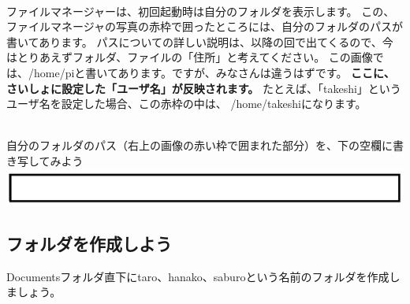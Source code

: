 \documentclass[a4paper,12pt]{jarticle}
\begin{document}
\\ファイルマネージャーは、初回起動時は自分のフォルダを表示します。
この、ファイルマネージャの写真の赤枠で囲ったところには、自分のフォルダのパスが書いてあります。
パスについての詳しい説明は、以降の回で出てくるので、今はとりあえずフォルダ、ファイルの「住所」と考えてください。
この画像では、/home/piと書いてあります。ですが、みなさんは違うはずです。
\textbf{\color{red}ここに、さいしょに設定した「ユーザ名」が反映されます。}
たとえば、「takeshi」というユーザ名を設定した場合、この赤枠の中は、
/home/takeshiになります。
\vspace{20pt}

\theQuestion\\
自分のフォルダのパス（右上の画像の赤い枠で囲まれた部分）を、下の空欄に書き写してみよう
\includegraphics[width=17cm]{textbook-img1021.png}
\clearpage

\subsection{\theExercise フォルダを作成しよう}
Documentsフォルダ直下にtaro、hanako、saburoという名前のフォルダを作成しましょう。\\
\end{document}
